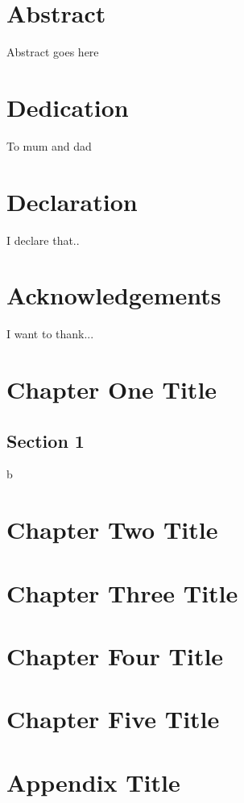 \documentclass[12pt, twoside]{report}
\begin{document}
   



\chapter*{Abstract}
Abstract goes here

\chapter*{Dedication}
To mum and dad

\chapter*{Declaration}
I declare that..

\chapter*{Acknowledgements}
I want to thank...

\tableofcontents


\chapter{Chapter One Title}

\section{Section 1}
\cite{einstein}
\newpage
b
\chapter{Chapter Two Title}


\chapter{Chapter Three Title}


\chapter{Chapter Four Title}


\chapter{Chapter Five Title}



\appendix
\chapter{Appendix Title}


\printbibliography
\end{document}
